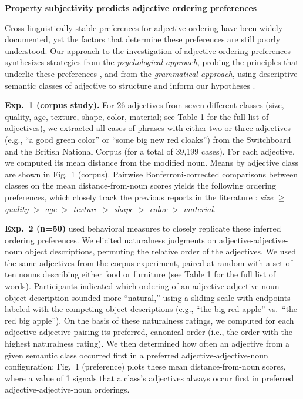 \documentclass[12pt]{article}
\begin{document}
\begin{center}\textbf{Property subjectivity predicts adjective ordering preferences}
\end{center}
	
	\vspace{-15pt}
	
Cross-linguistically stable preferences for adjective ordering have been widely documented, yet the factors that determine these preferences are still poorly understood. Our approach to the investigation of adjective ordering preferences synthesizes strategies from the \emph{psychological approach}, probing the principles that underlie these preferences \cite{sweet1898,ziff1960,martin1969determinants,martin1969competence,martin1970,kemmereretal2009}, and from the \emph{grammatical approach}, using descriptive semantic classes of adjective to structure and inform our hypotheses \cite{dixon1982,sproatshih1991,cinque1994,scott2002}. 

\textbf{Exp.~1 (corpus study).} For 26 adjectives from seven different classes (size, quality, age, texture, shape, color, material; see Table 1 for the full list of adjectives), we extracted all cases of phrases with either two or three adjectives (e.g., ``a good green color'' or ``some big new red cloaks'') from the Switchboard and the British National Corpus (for a total of 39,199 cases). For each adjective, we  computed its mean distance from the modified noun. Means by adjective class are shown in Fig.~1 (corpus). Pairwise Bonferroni-corrected comparisons between classes on the mean distance-from-noun scores yields the following ordering preferences, which closely track the previous reports in the literature \cite{sproatshih1991,dixon1982}:
\emph{size} $\geq$ \emph{quality} $>$  \emph{age} $>$  \emph{texture} $>$  \emph{shape} $>$  \emph{color} $>$  \emph{material}. %


\textbf{Exp.~2 (n=50)} used behavioral measures to closely replicate these inferred ordering preferences. We elicited naturalness judgments on adjective-adjective-noun object descriptions, permuting the relative order of the adjectives. We used the same adjectives from the corpus experiment, paired at random with a set of ten nouns describing either food or furniture (see Table 1 for the full list of words).
Participants indicated which ordering of an adjective-adjective-noun object description sounded more ``natural,'' using a sliding scale with endpoints labeled with the competing object descriptions (e.g., ``the big red apple'' vs.\ ``the red big apple''). On the basis of these naturalness ratings, we computed for each adjective-adjective pairing its preferred, canonical order (i.e., the order with the highest naturalness rating). We then determined how often an adjective from a given semantic class occurred first in a preferred adjective-adjective-noun configuration; Fig.~1 (preference) plots these mean distance-from-noun scores, where a value of 1 signals that a class's adjectives always occur first in preferred adjective-adjective-noun orderings. 
\end{document}
